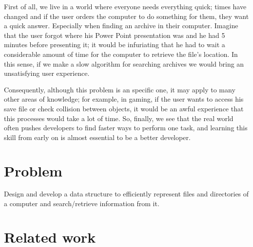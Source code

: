\documentclass{sig-alternate-05-2015}
\begin{document}
    First of all, we live in a world where everyone needs everything quick; times have changed and if the user orders the computer
    to do something for them, they want a quick answer. Especially when finding an archive in their computer. Imagine that the
    user forgot where his Power Point presentation was and he had 5 minutes before presenting it; it would be infuriating that he
    had to wait a considerable amount of time for the computer to retrieve the file's location. In this sense, if we make a slow algorithm for searching
    archives we would bring an unsatisfying user experience.

    Consequently, although this problem is an specific one, it may apply to many other areas of knowledge; for example, in gaming,
    if the user wants to access his save file or check collision between objects, it would be an awful experience that this processes would take
    a lot of time. So, finally, we see that the real world often pushes developers to find faster ways to perform one task, and
    learning this skill from early on is almost essential to be a better developer.

  \section{Problem}
    Design and develop a data structure to efficiently represent files and directories of a computer and search/retrieve information from it.

  \section{Related work}
\end{document}
